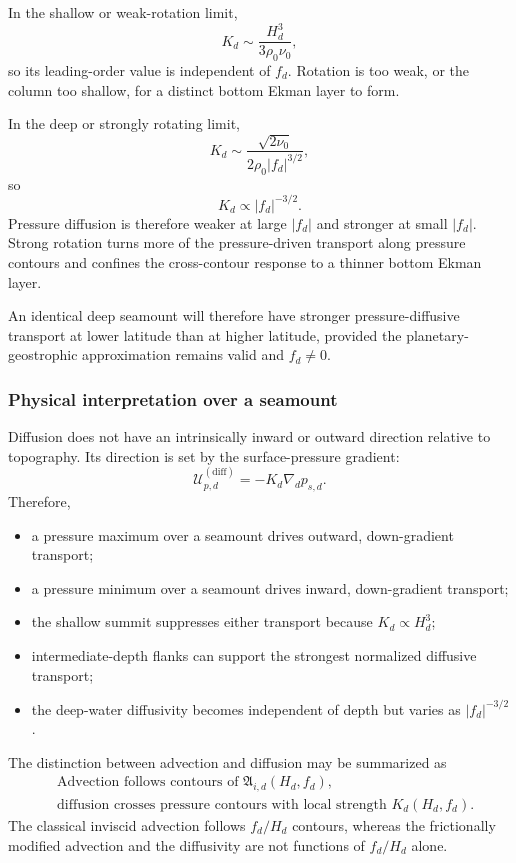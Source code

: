 \documentclass[10pt]{amsart}
\begin{document}
In the shallow or weak-rotation limit,
\begin{equation}
K_d
\sim
\frac{H_d^3}{3\rho_0\nu_0},
\end{equation}
so its leading-order value is independent of \(f_d\). Rotation is too
weak, or the column too shallow, for a distinct bottom Ekman layer to
form.

In the deep or strongly rotating limit,
\begin{equation}
K_d
\sim
\frac{\sqrt{2\nu_0}}
{2\rho_0|f_d|^{3/2}},
\end{equation}
so
\begin{equation}
K_d\propto |f_d|^{-3/2}.
\end{equation}
Pressure diffusion is therefore weaker at large \(|f_d|\) and stronger
at small \(|f_d|\). Strong rotation turns more of the pressure-driven
transport along pressure contours and confines the cross-contour
response to a thinner bottom Ekman layer.

An identical deep seamount will therefore have stronger
pressure-diffusive transport at lower latitude than at higher
latitude, provided the planetary-geostrophic approximation remains
valid and \(f_d\neq0\).


\subsubsection{Physical interpretation over a seamount}

Diffusion does not have an intrinsically inward or outward direction
relative to topography. Its direction is set by the surface-pressure
gradient:
\begin{equation}
\boldsymbol{\mathcal U}_{p,d}^{(\mathrm{diff})}
=
-K_d\nabla_d p_{s,d}.
\end{equation}
Therefore,
\begin{itemize}
\item a pressure maximum over a seamount drives outward,
      down-gradient transport;
\item a pressure minimum over a seamount drives inward,
      down-gradient transport;
\item the shallow summit suppresses either transport because
      \(K_d\propto H_d^3\);
\item intermediate-depth flanks can support the strongest normalized
      diffusive transport;
\item the deep-water diffusivity becomes independent of depth but
      varies as \(|f_d|^{-3/2}\).
\end{itemize}

The distinction between advection and diffusion may be summarized as
\begin{equation}
\boxed{
\begin{aligned}
&\text{Advection follows contours of }
\mathfrak A_{i,d}(H_d,f_d),
\\
&\text{diffusion crosses pressure contours with local strength }
K_d(H_d,f_d).
\end{aligned}
}
\end{equation}
The classical inviscid advection follows \(f_d/H_d\) contours, whereas
the frictionally modified advection and the diffusivity are not
functions of \(f_d/H_d\) alone.
\end{document}
